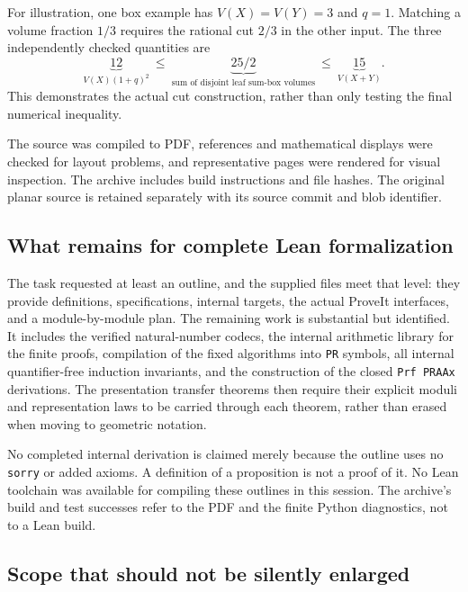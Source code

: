 For illustration, one box example has \(V(X)=V(Y)=3\) and \(q=1\).
Matching a volume fraction \(1/3\) requires the rational cut \(2/3\)
in the other input. The three independently checked quantities are
\[
 \underbrace{12}_{V(X)(1+q)^2}
 \ \leq\
 \underbrace{25/2}_{\text{sum of disjoint leaf sum-box volumes}}
 \ \leq\
 \underbrace{15}_{V(X+Y)}.
\]
This demonstrates the actual cut construction, rather than only testing
the final numerical inequality.

The source was compiled to PDF, references and mathematical displays were
checked for layout problems, and representative pages were rendered for
visual inspection. The archive includes build instructions and file
hashes. The original planar source is retained separately with its source
commit and blob identifier.

\subsection{What remains for complete Lean formalization}

The task requested at least an outline, and the supplied files meet that
level: they provide definitions, specifications, internal targets, the
actual ProveIt interfaces, and a module-by-module plan. The remaining work
is substantial but identified. It includes the verified natural-number
codecs, the internal arithmetic library for the finite proofs, compilation
of the fixed algorithms into \texttt{PR} symbols, all internal
quantifier-free induction invariants, and the construction of the closed
\texttt{Prf PRAAx} derivations. The presentation transfer theorems then
require their explicit moduli and representation laws to be carried
through each theorem, rather than erased when moving to geometric notation.

No completed internal derivation is claimed merely because the outline
uses no \texttt{sorry} or added axioms. A definition of a proposition is
not a proof of it. No Lean toolchain was available for compiling these
outlines in this session. The archive's build and test successes refer
to the PDF and the finite Python diagnostics, not to a Lean build.

\subsection{Scope that should not be silently enlarged}

